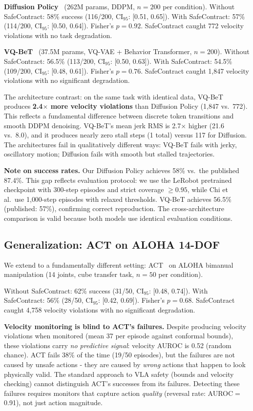 \documentclass[conference]{IEEEtran}
\begin{document}
\textbf{Diffusion Policy}~\cite{diffusionpolicy} (262M params, DDPM, $n{=}200$ per condition).
Without SafeContract: 58\% success (116/200, CI$_{95}$: [0.51, 0.65]).
With SafeContract: 57\% (114/200, CI$_{95}$: [0.50, 0.64]).
Fisher's $p = 0.92$.
SafeContract caught 772 velocity violations with no task degradation.

\textbf{VQ-BeT}~\cite{vqbet} (37.5M params, VQ-VAE + Behavior Transformer, $n{=}200$).
Without SafeContract: 56.5\% (113/200, CI$_{95}$: [0.50, 0.63]).
With SafeContract: 54.5\% (109/200, CI$_{95}$: [0.48, 0.61]).
Fisher's $p = 0.76$.
SafeContract caught 1{,}847 velocity violations with no significant degradation.

The architecture contrast: on the same task with identical data, VQ-BeT produces \textbf{2.4$\times$ more velocity violations} than Diffusion Policy (1{,}847 vs.\ 772).
This reflects a fundamental difference between discrete token transitions and smooth DDPM denoising.
VQ-BeT's mean jerk RMS is 2.7$\times$ higher (21.6 vs.\ 8.0), and it produces nearly zero stall steps (1 total) versus 117 for Diffusion.
The architectures fail in qualitatively different ways: VQ-BeT fails with jerky, oscillatory motion; Diffusion fails with smooth but stalled trajectories.

\textbf{Note on success rates.}
Our Diffusion Policy achieves 58\% vs.\ the published 87.4\%.
This gap reflects evaluation protocol: we use the LeRobot pretrained checkpoint with 300-step episodes and strict coverage $\ge 0.95$, while Chi et al.\ use 1{,}000-step episodes with relaxed thresholds.
VQ-BeT achieves 56.5\% (published: 57\%), confirming correct reproduction.
The cross-architecture comparison is valid because both models use identical evaluation conditions.

\subsection{Generalization: ACT on ALOHA 14-DOF}
\label{sec:aloha}

We extend to a fundamentally different setting: ACT~\cite{act} on ALOHA bimanual manipulation (14 joints, cube transfer task, $n{=}50$ per condition).

Without SafeContract: 62\% success (31/50, CI$_{95}$: [0.48, 0.74]).
With SafeContract: 56\% (28/50, CI$_{95}$: [0.42, 0.69]).
Fisher's $p = 0.68$.
SafeContract caught 4{,}758 velocity violations with no significant degradation.

\textbf{Velocity monitoring is blind to ACT's failures.}
Despite producing velocity violations when monitored (mean 37 per episode against conformal bounds), these violations carry \emph{no predictive signal}: velocity AUROC is 0.52 (random chance).
ACT fails 38\% of the time (19/50 episodes), but the failures are not caused by unsafe actions - they are caused by \emph{wrong} actions that happen to look physically valid.
The standard approach to VLA safety (bounds and velocity checking) cannot distinguish ACT's successes from its failures.
Detecting these failures requires monitors that capture action \emph{quality} (reversal rate: AUROC${=}$0.91), not just action magnitude.
\end{document}
